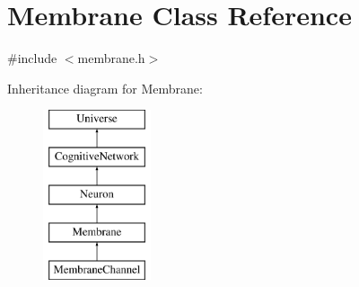 \hypertarget{classMembrane}{}\section{Membrane Class Reference}
\label{classMembrane}


{\ttfamily \#include $<$membrane.\+h$>$}

Inheritance diagram for Membrane\+:\begin{figure}[H]
\begin{center}
\leavevmode
\includegraphics[height=5.000000cm]{classMembrane}
\end{center}
\end{figure}
